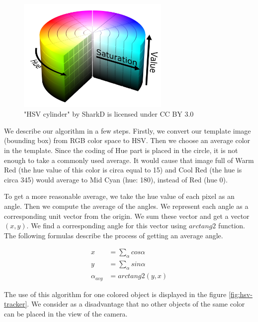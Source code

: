\begin{figure}[h!]\centering
\includegraphics[width=0.65\textwidth]{img/hsv-cylinder.png}
\caption{"HSV cylinder" by SharkD is licensed under CC BY 3.0}
\end{figure}

We describe our algorithm in a few steps. Firstly, we convert our template
image (bounding box) from RGB color space to HSV. Then we choose an average
color in the template. Since the coding of Hue part is placed in the circle, it
is not enough to take a commonly used average. It would cause that image full
of Warm Red (the hue value of this color is circa equal to 15) and Cool Red
(the hue is circa 345) would average to Mid Cyan (hue: 180), instead of Red
(hue 0).

To get a more reasonable average, we take the hue value of each pixel as an
angle. Then we compute the average of the angles. We represent each angle as a
corresponding unit vector from the origin. We sum these vector and get a vector
$(x, y)$. We find a corresponding angle for this vector using $arctang2$
function.  The following formulas describe the process of getting an average
angle.

$$
\begin{aligned}
x &= \sum_\alpha cos \alpha \\
y &= \sum_\alpha sin \alpha \\
\alpha_{avg} &= arctang2(y, x)
\end{aligned}
$$

The use of this algorithm for one colored object is displayed in the figure
\ref{fig:hsv-tracker}. We consider as a disadvantage that no other objects of
the same color can be placed in the view of the camera.

